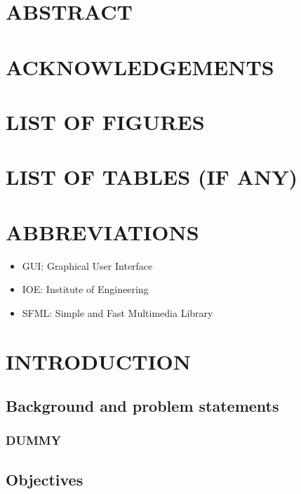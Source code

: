 \documentclass[12pt, final]{report}
\begin{document}
\chapter*{ABSTRACT}

\chapter*{ACKNOWLEDGEMENTS}

\tableofcontents
{}

\pagebreak

\chapter*{LIST OF FIGURES}

\chapter*{LIST OF TABLES (IF ANY)}

\chapter*{ABBREVIATIONS}
\begin{itemize}
	\item GUI: Graphical User Interface
	\item IOE: Institute of Engineering
	\item SFML: Simple and Fast Multimedia Library
	
\end{itemize}

\chapter{INTRODUCTION}
\blindtext
\section{Background and problem statements}
	\blindtext
	\subsection{DUMMY}
	\blindtext
\section{Objectives}
\end{document}
